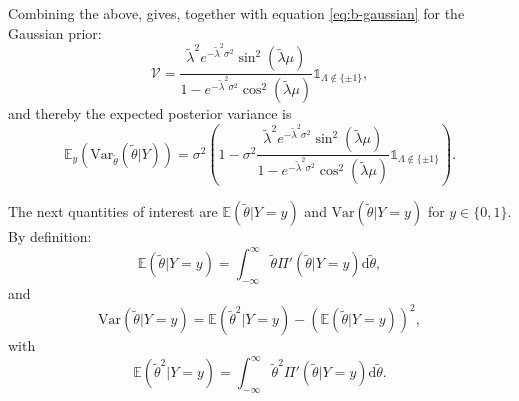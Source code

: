 \documentclass[]{report}
\begin{document}
Combining the above, gives, together with equation \eqref{eq:b-gaussian} for the Gaussian prior:
\begin{equation}
    \mathcal{V} = \frac{\tilde{\lambda}^2 e^{-\tilde{\lambda}^2\sigma^2} \sin^2(\tilde{\lambda}\mu)}{1-e^{-\tilde{\lambda}^2\sigma^2} \cos^2(\tilde{\lambda}\mu)}\mathbb{1}_{\Lambda \notin \{\pm1\}},
\end{equation}
and thereby the expected posterior variance is
\begin{equation}
    \mathbb{E}_y(\text{Var}_{\tilde{\theta}}(\tilde{\theta} | Y)) = \sigma^2(1-\sigma^2\frac{\tilde{\lambda}^2 e^{-\tilde{\lambda}^2\sigma^2} \sin^2(\tilde{\lambda}\mu)}{1-e^{-\tilde{\lambda}^2\sigma^2} \cos^2(\tilde{\lambda}\mu)}\mathbb{1}_{\Lambda \notin \{\pm1\}}).
\end{equation}

The next quantities of interest are $\mathbb{E}(\tilde{\theta} | Y=y)$ and $\text{Var}(\tilde{\theta}|Y=y)$ for $y\in \{0,1\}$. By definition:
\begin{equation}
    \mathbb{E}(\tilde{\theta} | Y=y) = \int_{-\infty}^{\infty} \tilde{\theta} \Pi'(\tilde{\theta}|Y=y)\text{d}\tilde{\theta},
\end{equation}
and
\begin{equation}
    \text{Var}(\tilde{\theta}|Y=y) = \mathbb{E}(\tilde{\theta}^2 | Y=y) - (\mathbb{E}(\tilde{\theta} | Y=y))^2,
\end{equation}
with
\begin{equation}
    \mathbb{E}(\tilde{\theta}^2 | Y=y) = \int_{-\infty}^{\infty} \tilde{\theta}^2 \Pi'(\tilde{\theta}|Y=y)\text{d}\tilde{\theta}.
\end{equation}
\end{document}
